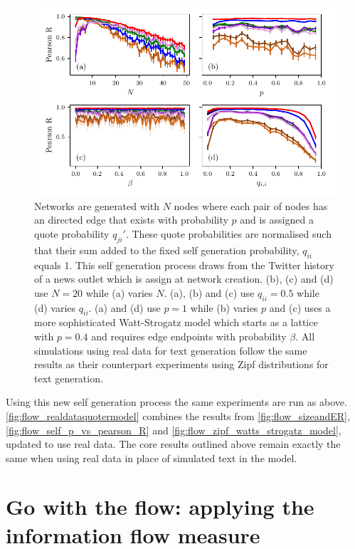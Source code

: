 \begin{figure}[!htbp]
	\centering
	\includegraphics{./chapter3/figs/real_data_simulations.pdf}
	\caption{Networks are generated with $N$ nodes where each pair of nodes has an directed edge that exists with probability $p$ and is assigned a quote probability $q_{ji}'$. These quote probabilities are normalised such that their sum added to the fixed self generation probability, $q_{ii}$ equals 1. This self generation process draws from the Twitter history of a news outlet which is assign at network creation. (b), (c) and (d) use $N=20$ while (a) varies $N$. (a), (b) and (c) use $q_{ii}=0.5$ while (d) varies $q_{ii}$.  (a) and (d) use $p=1$ while (b) varies $p$ and (c) uses a more sophisticated Watt-Strogatz model which starts as a lattice with $p=0.4$ and requires edge endpoints with probability $\beta$. All simulations using real data for text generation follow the same results as their counterpart experiments using Zipf distributions for text generation.}
	\label{fig:flow_realdataquotermodel}
\end{figure}

Using this new self generation process the same experiments are run as above. \autoref{fig:flow_realdataquotermodel} combines the results from \autoref{fig:flow_sizeandER}, \autoref{fig:flow_self_p_vs_pearson_R} and \autoref{fig:flow_zipf_watts_strogatz_model}, updated to use real data. The core results outlined above remain exactly the same when using real data in place of simulated text in the model. 


\section{Go with the flow: applying the information flow measure}\label{sec:gowiththeflow}
